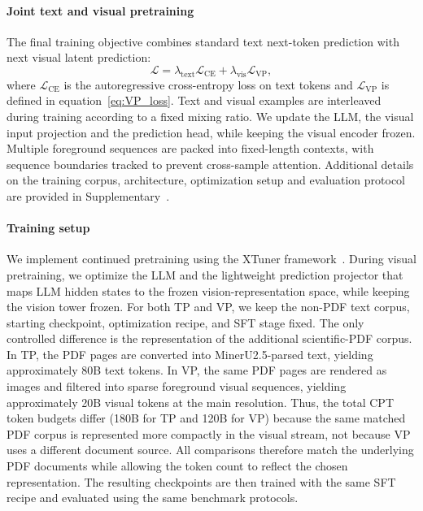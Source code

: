 \paragraph{Joint text and visual pretraining}
The final training objective combines standard text next-token prediction with next visual latent prediction:
\begin{equation}
\mathcal{L}
=
\lambda_{\mathrm{text}}\mathcal{L}_{\mathrm{CE}}
+
\lambda_{\mathrm{vis}}\mathcal{L}_{\mathrm{VP}},
\label{eq:joint_objective}
\end{equation}
where $\mathcal{L}_{\mathrm{CE}}$ is the autoregressive cross-entropy loss on text tokens and $\mathcal{L}_{\mathrm{VP}}$ is defined in equation~\eqref{eq:VP_loss}. Text and visual examples are interleaved during training according to a fixed mixing ratio. We update the LLM, the visual input projection and the prediction head, while keeping the visual encoder frozen. Multiple foreground sequences are packed into fixed-length contexts, with sequence boundaries tracked to prevent cross-sample attention. Additional details on the training corpus, architecture, optimization setup and evaluation protocol are provided in Supplementary~.

\paragraph{Training setup}
We implement continued pretraining using the XTuner framework~\citep{2023xtuner}.
During visual pretraining, we optimize the LLM and the lightweight prediction projector that maps LLM hidden states to the frozen vision-representation space, while keeping the vision tower frozen.
For both TP and VP, we keep the non-PDF text corpus, starting checkpoint, optimization recipe, and SFT stage fixed. 
The only controlled difference is the representation of the additional scientific-PDF corpus. 
In TP, the PDF pages are converted into MinerU2.5-parsed text, yielding approximately 80B text tokens. 
In VP, the same PDF pages are rendered as images and filtered into sparse foreground visual sequences, yielding approximately 20B visual tokens at the main resolution. 
Thus, the total CPT token budgets differ (180B for TP and 120B for VP) 
because the same matched PDF corpus is represented more compactly in the visual stream, 
not because VP uses a different document source. 
All comparisons therefore match the underlying PDF documents while allowing the token count to reflect the chosen representation.
The resulting checkpoints are then trained with the same SFT recipe and evaluated using the same benchmark protocols.

